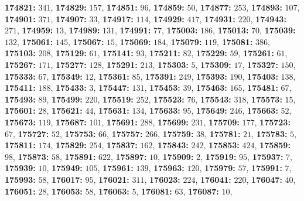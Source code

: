 \textsf{\bfseries 174821:} $341$, \textsf{\bfseries 174829:} $157$, \textsf{\bfseries 174851:} $96$, \textsf{\bfseries 174859:} $50$, \textsf{\bfseries 174877:} $253$, \textsf{\bfseries 174893:} $107$, \textsf{\bfseries 174901:} $371$, \textsf{\bfseries 174907:} $33$, \textsf{\bfseries 174917:} $114$, \textsf{\bfseries 174929:} $417$, \textsf{\bfseries 174931:} $220$, \textsf{\bfseries 174943:} $271$, \textsf{\bfseries 174959:} $13$, \textsf{\bfseries 174989:} $131$, \textsf{\bfseries 174991:} $77$, \textsf{\bfseries 175003:} $186$, \textsf{\bfseries 175013:} $70$, \textsf{\bfseries 175039:} $132$, \textsf{\bfseries 175061:} $145$, \textsf{\bfseries 175067:} $15$, \textsf{\bfseries 175069:} $184$, \textsf{\bfseries 175079:} $119$, \textsf{\bfseries 175081:} $386$, \textsf{\bfseries 175103:} $208$, \textsf{\bfseries 175129:} $61$, \textsf{\bfseries 175141:} $93$, \textsf{\bfseries 175211:} $82$, \textsf{\bfseries 175229:} $59$, \textsf{\bfseries 175261:} $61$, \textsf{\bfseries 175267:} $171$, \textsf{\bfseries 175277:} $128$, \textsf{\bfseries 175291:} $213$, \textsf{\bfseries 175303:} $5$, \textsf{\bfseries 175309:} $17$, \textsf{\bfseries 175327:} $150$, \textsf{\bfseries 175333:} $67$, \textsf{\bfseries 175349:} $12$, \textsf{\bfseries 175361:} $85$, \textsf{\bfseries 175391:} $249$, \textsf{\bfseries 175393:} $190$, \textsf{\bfseries 175403:} $138$, \textsf{\bfseries 175411:} $188$, \textsf{\bfseries 175433:} $3$, \textsf{\bfseries 175447:} $131$, \textsf{\bfseries 175453:} $39$, \textsf{\bfseries 175463:} $165$, \textsf{\bfseries 175481:} $67$, \textsf{\bfseries 175493:} $89$, \textsf{\bfseries 175499:} $220$, \textsf{\bfseries 175519:} $252$, \textsf{\bfseries 175523:} $76$, \textsf{\bfseries 175543:} $318$, \textsf{\bfseries 175573:} $15$, \textsf{\bfseries 175601:} $28$, \textsf{\bfseries 175621:} $44$, \textsf{\bfseries 175631:} $134$, \textsf{\bfseries 175633:} $95$, \textsf{\bfseries 175649:} $246$, \textsf{\bfseries 175663:} $52$, \textsf{\bfseries 175673:} $119$, \textsf{\bfseries 175687:} $101$, \textsf{\bfseries 175691:} $288$, \textsf{\bfseries 175699:} $231$, \textsf{\bfseries 175709:} $177$, \textsf{\bfseries 175723:} $67$, \textsf{\bfseries 175727:} $52$, \textsf{\bfseries 175753:} $66$, \textsf{\bfseries 175757:} $266$, \textsf{\bfseries 175759:} $38$, \textsf{\bfseries 175781:} $21$, \textsf{\bfseries 175783:} $5$, \textsf{\bfseries 175811:} $174$, \textsf{\bfseries 175829:} $254$, \textsf{\bfseries 175837:} $162$, \textsf{\bfseries 175843:} $242$, \textsf{\bfseries 175853:} $424$, \textsf{\bfseries 175859:} $98$, \textsf{\bfseries 175873:} $58$, \textsf{\bfseries 175891:} $622$, \textsf{\bfseries 175897:} $10$, \textsf{\bfseries 175909:} $2$, \textsf{\bfseries 175919:} $95$, \textsf{\bfseries 175937:} $7$, \textsf{\bfseries 175939:} $10$, \textsf{\bfseries 175949:} $105$, \textsf{\bfseries 175961:} $139$, \textsf{\bfseries 175963:} $120$, \textsf{\bfseries 175979:} $57$, \textsf{\bfseries 175991:} $7$, \textsf{\bfseries 175993:} $58$, \textsf{\bfseries 176017:} $95$, \textsf{\bfseries 176021:} $311$, \textsf{\bfseries 176023:} $224$, \textsf{\bfseries 176041:} $220$, \textsf{\bfseries 176047:} $40$, \textsf{\bfseries 176051:} $28$, \textsf{\bfseries 176053:} $58$, \textsf{\bfseries 176063:} $5$, \textsf{\bfseries 176081:} $63$, \textsf{\bfseries 176087:} $10$, 
